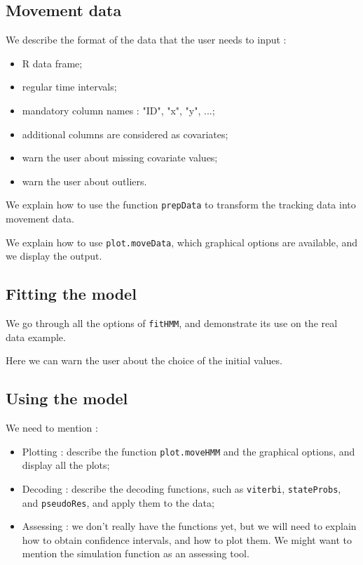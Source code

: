 \documentclass[]{article}
\begin{document}
\subsection{Movement data}
We describe the format of the data that the user needs to input :
\begin{itemize}
	\item R data frame;
	\item regular time intervals;
	\item mandatory column names : "ID", "x", "y", ...;
	\item additional columns are considered as covariates;
	\item warn the user about missing covariate values;
	\item warn the user about outliers.
\end{itemize}

We explain how to use the function \texttt{prepData} to transform the tracking data into movement data.

We explain how to use \texttt{plot.moveData}, which graphical options are available, and we display the output.

\subsection{Fitting the model}
We go through all the options of \texttt{fitHMM}, and demonstrate its use on the real data example.

Here we can warn the user about the choice of the initial values.

\subsection{Using the model}
We need to mention :
\begin{itemize}
	\item Plotting : describe the function \texttt{plot.moveHMM} and the graphical options, and display all the plots;
	\item Decoding : describe the decoding functions, such as \texttt{viterbi}, \texttt{stateProbs}, and \texttt{pseudoRes}, and apply them to the data;
	\item Assessing : we don't really have the functions yet, but we will need to explain how to obtain confidence intervals, and how to plot them. We might want to mention the simulation function as an assessing tool.
\end{itemize}
\end{document}
